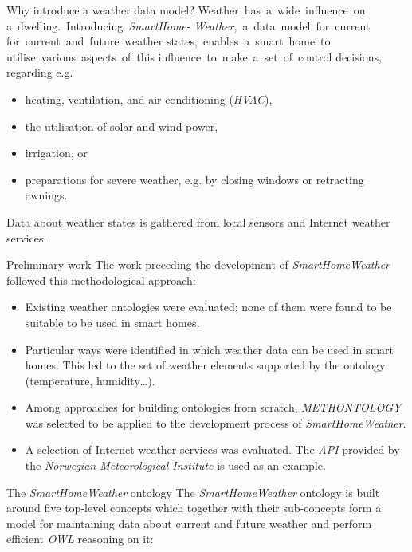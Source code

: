 \documentclass[final,hyperref={pdfpagelabels=true}]{beamer}
\begin{document}
\begin{frame}[fragile]
\begin{columns}[t]
\begin{column}{.45\textwidth}
\begin{block}{Why introduce a weather data model?}
	\mbox{Weather has a wide influence on}
	\mbox{a dwelling. Introducing \emph{SmartHome-}}
	\mbox{\emph{Weather}, a data model for current}
	\mbox{for current and future weather}
	\mbox{states, enables a smart home to}
	\mbox{utilise various aspects of this}
	\mbox{influence to make a set of control}
	decisions, regarding e.g.
	\begin{itemize}
  	  \item heating, ventilation, and air conditioning (\emph{HVAC}),
	  \item the utilisation of solar and wind power,
	  \item irrigation, or
	  \item preparations for severe weather, e.g. by closing windows or retracting awnings.
	\end{itemize}

	Data about weather states is gathered from local sensors and Internet weather services.
      \end{block}

      \begin{block}{Preliminary work}
	The work preceding the development of \emph{SmartHomeWeather} followed this methodological approach:
	\begin{itemize}
	  \item Existing weather ontologies were evaluated; none of them were found to be suitable to be used in smart homes.
	  \item Particular ways were identified in which weather data can be used in smart homes. This led to the set of weather elements supported by the ontology (temperature, humidity…).
	  \item Among approaches for building ontologies from scratch, \emph{METHONTOLOGY}~\cite{Methontology} was selected to be applied to the development process of \emph{SmartHomeWeather}.
	  \item A selection of Internet weather services was evaluated. The \emph{API} provided by the \emph{Norwegian Meteorological Institute} is used as an example.
	\end{itemize}
      \end{block}

      \begin{block}{The \emph{SmartHomeWeather} ontology}
	The \emph{SmartHomeWeather} ontology is built around five top-level
	concepts which together with their sub-concepts form a model for
	maintaining data about current and future weather and perform efficient
	\emph{OWL} reasoning on it:
	

\end{block}
\end{column}
\end{columns}
\end{frame}
\end{document}
